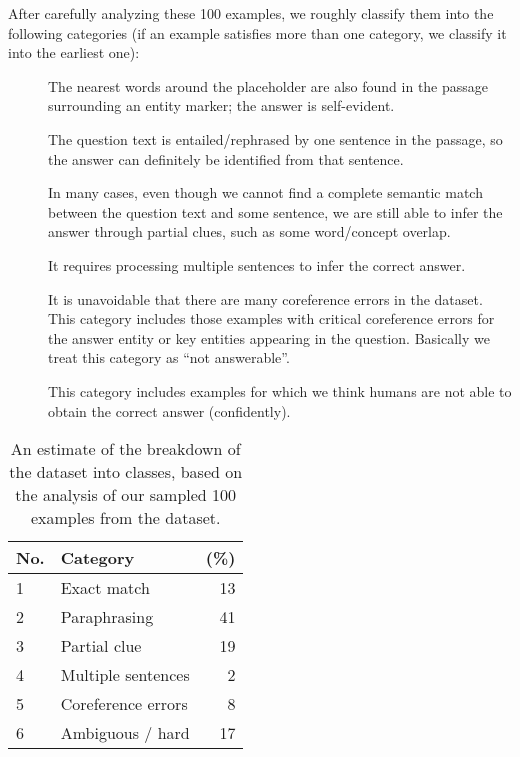  After carefully analyzing these 100 examples,  we roughly classify them into the following categories (if an example satisfies more than one category, we classify it into the earliest one):
\begin{description}
    \item[] The nearest words around the placeholder are also found in the passage surrounding an entity marker; the answer is self-evident.
    \item[] The question text is entailed\slash rephrased by  one sentence in the passage, so the answer can definitely be identified from that sentence.
    \item[] In many cases, even though we cannot find a complete semantic match between the question text and some sentence, we are still able to infer the answer through partial clues, such as some word/concept overlap.
    \item[] It requires processing multiple sentences to infer the correct answer.
    \item[] It is unavoidable that there are many coreference errors in the dataset. This category includes those examples with critical coreference errors for the answer entity or key entities appearing in the question. Basically we treat this category as ``not answerable''.
    \item[] This category includes examples for which we think humans are not able to obtain the correct answer (confidently).
\end{description}

\begin{table}
  \centering
    \begin{tabular}{l  l  r}
      \toprule
    No. & Category &  (\%)  \\
    \midrule
    1 & Exact match & 13   \\
    2 & Paraphrasing & 41 \\
    3 & Partial clue & 19  \\
    4 & Multiple sentences & 2  \\
    \midrule
    5 & Coreference errors & 8 \\
    6 & Ambiguous / hard &  17 \\
    \bottomrule
    \end{tabular}
    \caption{An estimate of the breakdown of the dataset into classes,
      based on the analysis of our sampled 100 examples from the  dataset.}
    \label{table:example-breakdown}
\end{table}

